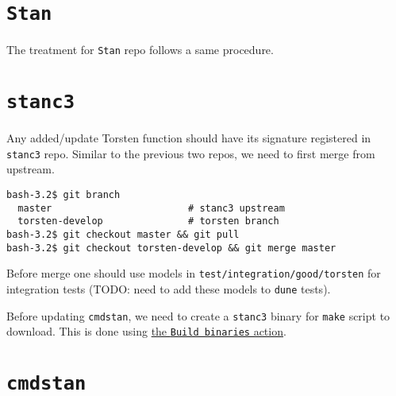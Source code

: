 \documentclass[12pt, reqno, oneside]{amsbook}
\numberwithin{equation}{chapter}
\numberwithin{figure}{chapter}
\numberwithin{table}{chapter}
\theoremstyle{remark}
\begin{document}
\section{\texttt{Stan}}
\label{sec:orgdc30a5a}
The treatment for \texttt{Stan} repo follows a same procedure. 

\section{\texttt{stanc3}}
\label{sec:orgbe3602a}
Any added/update Torsten function should have its signature registered
in \texttt{stanc3} repo. Similar to the previous two repos, we need to first
merge from upstream.
\begin{verbatim}
bash-3.2$ git branch
  master                        # stanc3 upstream 
  torsten-develop               # torsten branch
bash-3.2$ git checkout master && git pull
bash-3.2$ git checkout torsten-develop && git merge master
\end{verbatim}
Before merge one should use models in \texttt{test/integration/good/torsten}
for integration tests (TODO: need to add these models to \texttt{dune} tests).

Before updating \texttt{cmdstan}, we need to create a \texttt{stanc3} binary for
\texttt{make} script to download. This is done using \href{https://github.com/metrumresearchgroup/stanc3/actions}{the \texttt{Build binaries}
action}.


\section{\texttt{cmdstan}}
\label{sec:org6b03559}
\end{document}
